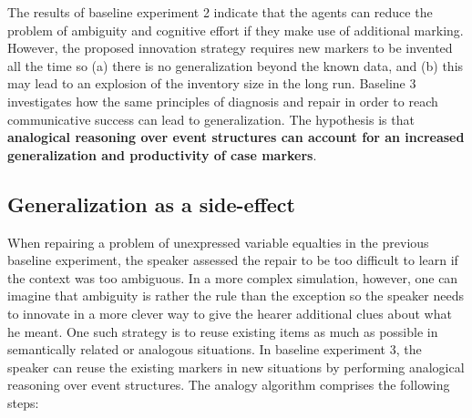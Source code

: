 The results of baseline experiment 2 indicate that the agents can reduce the problem of ambiguity and cognitive effort if they make use of additional marking. However, the proposed innovation strategy requires new markers to be invented all the time so (a) there is no generalization beyond the known data, and (b) this may lead to an explosion of the inventory size in the long run. Baseline 3 investigates how the same principles of diagnosis and repair in order to reach communicative success can lead to generalization. The hypothesis is that {\bfseries analogical reasoning over event structures can account for an increased generalization and productivity of case markers}.

\subsection{Generalization as a side-effect}

When repairing a problem of unexpressed variable equalties in the previous baseline experiment, the speaker assessed the repair to be too difficult to learn if the context was too ambiguous. In a more complex simulation, however, one can imagine that ambiguity is rather the rule than the exception so the speaker needs to innovate in a more clever way to give the hearer additional clues about what he meant. One such strategy is to reuse existing items as much as possible in semantically related or analogous situations. In baseline experiment 3, the speaker can reuse the existing markers in new situations by performing analogical reasoning over event structures. The analogy algorithm comprises the following steps:

